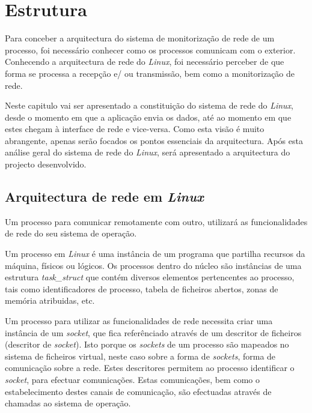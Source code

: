\chapter{Estrutura}
\label{cap:Estrutura}

Para conceber a arquitectura do sistema de monitorização de rede de um processo, foi necessário conhecer como os processos comunicam com o exterior.
 Conhecendo a arquitectura de rede do \textit{Linux}, foi necessário perceber de que forma se processa a recepção e/ ou transmissão, bem como a monitorização de rede. 

Neste capitulo vai ser apresentado a constituição do sistema de rede do \textit{Linux}, desde o momento em que a aplicação envia os dados, até ao momento em que estes chegam à interface de rede e vice-versa.
Como esta visão é muito abrangente, apenas serão focados os pontos essenciais da arquitectura.
Após esta análise geral do sistema de rede do \textit{Linux}, será apresentado a arquitectura do projecto desenvolvido.


\section{Arquitectura de rede em \textit{Linux}}
\label{sub:network}
 Um processo para comunicar remotamente com outro, utilizará as funcionalidades de rede do seu sistema de operação.
 
 Um processo em \textit{Linux} é uma instância de um programa que partilha recursos da máquina, físicos ou lógicos.
 Os processos dentro do núcleo são instâncias de uma estrutura \textit{task\_struct} que contém diversos elementos pertencentes ao processo, tais como identificadores de processo, tabela de ficheiros abertos, zonas de memória atribuidas, etc.
 
 Um processo para utilizar as funcionalidades de rede necessita criar uma instância de um \textit{socket}, que fica referênciado através de um descritor de ficheiros (descritor de \textit{socket}).
 Isto porque os \textit{sockets} de um processo são mapeados no sistema de ficheiros virtual, neste caso sobre a forma de \textit{sockets}, forma de comunicação sobre a rede.
 Estes descritores permitem ao processo identificar o \textit{socket}, para efectuar comunicações.
 Estas comunicações, bem como o estabelecimento destes canais de comunicação, são efectuadas através de chamadas ao sistema de operação.

